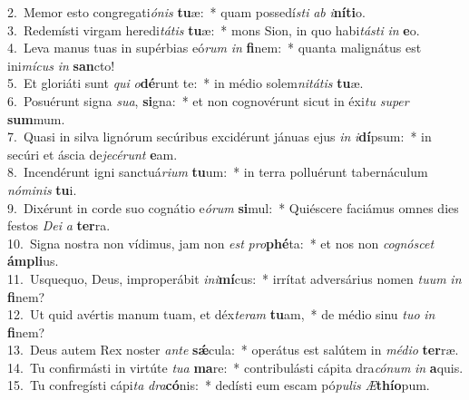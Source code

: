 {2.~}Memor esto congregati\textit{ó}\textit{nis} \textbf{tu}æ:~* quam possedí\textit{sti} \textit{ab} \textit{i}\textbf{ní}\textbf{ti}o.\\
{3.~}Redemísti virgam heredi\textit{tá}\textit{tis} \textbf{tu}æ:~* mons Sion, in quo habi\textit{tá}\textit{sti} \textit{in} \textbf{e}o.\\
{4.~}Leva manus tuas in supérbias eó\textit{rum} \textit{in} \textbf{fi}nem:~* quanta malignátus est ini\textit{mí}\textit{cus} \textit{in} \textbf{san}cto!\\
{5.~}Et gloriáti sunt \textit{qui} \textit{o}\textbf{dé}runt te:~* in médio solem\textit{ni}\textit{tá}\textit{tis} \textbf{tu}æ.\\
{6.~}Posuérunt signa \textit{su}\textit{a}, \textbf{si}gna:~* et non cognovérunt sicut in éxi\textit{tu} \textit{su}\textit{per} \textbf{sum}mum.\\
{7.~}Quasi in silva lignórum secúribus excidérunt jánuas ejus \textit{in} \textit{i}\textbf{dí}psum:~* in secúri et áscia de\textit{je}\textit{cé}\textit{runt} \textbf{e}am.\\
{8.~}Incendérunt igni sanctuá\textit{ri}\textit{um} \textbf{tu}um:~* in terra polluérunt tabernáculum \textit{nó}\textit{mi}\textit{nis} \textbf{tu}i.\\
{9.~}Dixérunt in corde suo cognátio e\textit{ó}\textit{rum} \textbf{si}mul:~* Quiéscere faciámus omnes dies festos \textit{De}\textit{i} \textit{a} \textbf{ter}ra.\\
{10.~}Signa nostra non vídimus, jam non \textit{est} \textit{pro}\textbf{phé}ta:~* et nos non \textit{co}\textit{gnó}\textit{scet} \textbf{ám}\textbf{pli}us.\\
{11.~}Usquequo, Deus, improperábit \textit{i}\textit{ni}\textbf{mí}cus:~* irrítat adversárius nomen \textit{tu}\textit{um} \textit{in} \textbf{fi}nem?\\
{12.~}Ut quid avértis manum tuam, et déx\textit{te}\textit{ram} \textbf{tu}am,~* de médio sinu \textit{tu}\textit{o} \textit{in} \textbf{fi}nem?\\
{13.~}Deus autem Rex noster \textit{an}\textit{te} \textbf{sǽ}cula:~* operátus est salútem in \textit{mé}\textit{di}\textit{o} \textbf{ter}ræ.\\
{14.~}Tu confirmásti in virtúte \textit{tu}\textit{a} \textbf{ma}re:~* contribulásti cápita dra\textit{có}\textit{num} \textit{in} \textbf{a}quis.\\
{15.~}Tu confregísti cápi\textit{ta} \textit{dra}\textbf{có}nis:~* dedísti eum escam pó\textit{pu}\textit{lis} \textit{Æ}\textbf{thí}\textbf{o}pum.\\
